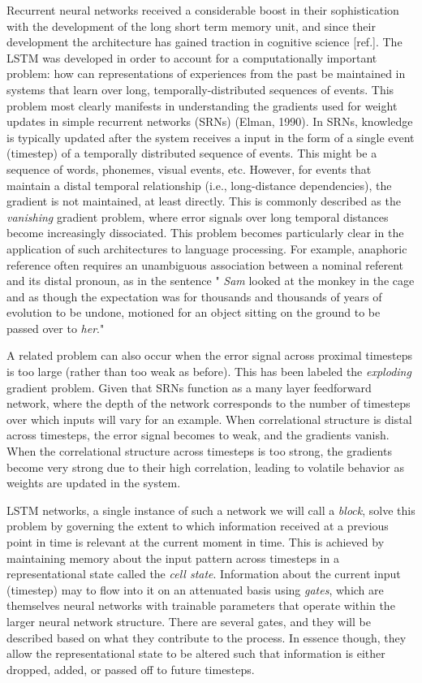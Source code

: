 \documentclass[
  american,
  man,floatsintext]{apa6}
\begin{document}
Recurrent neural networks received a considerable boost in their sophistication with the development of the long short term memory unit, and since their development the architecture has gained traction in cognitive science {[}ref.{]}. The LSTM was developed in order to account for a computationally important problem: how can representations of experiences from the past be maintained in systems that learn over long, temporally-distributed sequences of events. This problem most clearly manifests in understanding the gradients used for weight updates in simple recurrent networks (SRNs) (Elman, 1990). In SRNs, knowledge is typically updated after the system receives a input in the form of a single event (timestep) of a temporally distributed sequence of events. This might be a sequence of words, phonemes, visual events, etc. However, for events that maintain a distal temporal relationship (i.e., long-distance dependencies), the gradient is not maintained, at least directly. This is commonly described as the \emph{vanishing} gradient problem, where error signals over long temporal distances become increasingly dissociated. This problem becomes particularly clear in the application of such architectures to language processing. For example, anaphoric reference often requires an unambiguous association between a nominal referent and its distal pronoun, as in the sentence " \emph{Sam} looked at the monkey in the cage and as though the expectation was for thousands and thousands of years of evolution to be undone, motioned for an object sitting on the ground to be passed over to \emph{her}."

A related problem can also occur when the error signal across proximal timesteps is too large (rather than too weak as before). This has been labeled the \emph{exploding} gradient problem. Given that SRNs function as a many layer feedforward network, where the depth of the network corresponds to the number of timesteps over which inputs will vary for an example. When correlational structure is distal across timesteps, the error signal becomes to weak, and the gradients vanish. When the correlational structure across timesteps is too strong, the gradients become very strong due to their high correlation, leading to volatile behavior as weights are updated in the system.

LSTM networks, a single instance of such a network we will call a \emph{block}, solve this problem by governing the extent to which information received at a previous point in time is relevant at the current moment in time. This is achieved by maintaining memory about the input pattern across timesteps in a representational state called the \emph{cell state}. Information about the current input (timestep) may to flow into it on an attenuated basis using \emph{gates}, which are themselves neural networks with trainable parameters that operate within the larger neural network structure. There are several gates, and they will be described based on what they contribute to the process. In essence though, they allow the representational state to be altered such that information is either dropped, added, or passed off to future timesteps.
\end{document}
